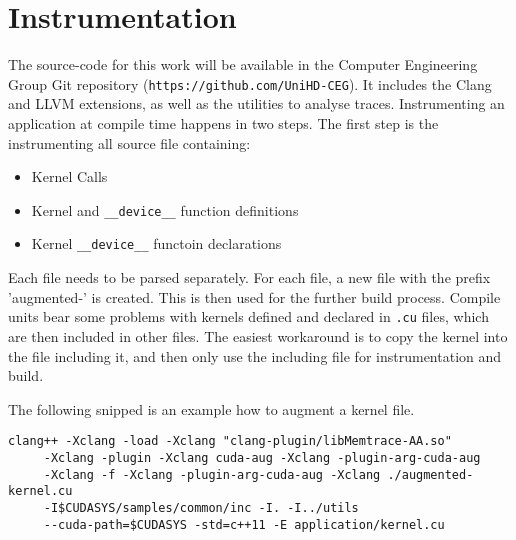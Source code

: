 \chapter{Instrumentation}
The source-code for this work will be available in the Computer Engineering Group Git repository (\verb|https://github.com/UniHD-CEG|). It includes the Clang and LLVM extensions, as well as
the utilities to analyse traces.
Instrumenting an application at compile time happens in two steps. The first step is the instrumenting all 
source file containing:
\begin{itemize}
	\item Kernel Calls
	\item Kernel and \verb|__device__| function definitions
	\item Kernel \verb|__device__| functoin declarations
\end{itemize}

Each file needs to be parsed separately. For each file, a new file with the prefix 'augmented-' is created. This is then used for
the further build process. Compile units bear some problems with kernels defined and declared in \verb|.cu| files, which are then included
in other files. The easiest workaround is to copy the kernel into the file including it, and then only use the including file for instrumentation and build.

The following snipped is an example how to augment a kernel file.
\begin{lstlisting}[style=C]
clang++ -Xclang -load -Xclang "clang-plugin/libMemtrace-AA.so"
	 -Xclang -plugin -Xclang cuda-aug -Xclang -plugin-arg-cuda-aug 
	 -Xclang -f -Xclang -plugin-arg-cuda-aug -Xclang ./augmented-kernel.cu 
	 -I$CUDASYS/samples/common/inc -I. -I../utils
     --cuda-path=$CUDASYS -std=c++11 -E application/kernel.cu 
\end{lstlisting}

